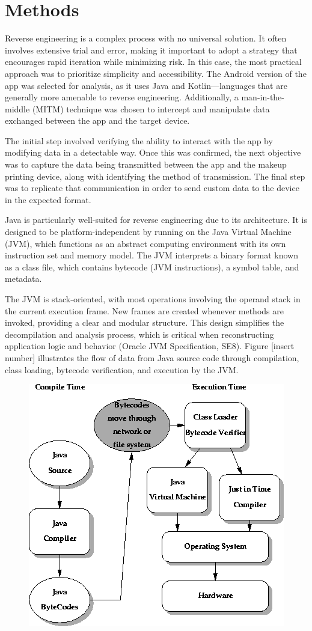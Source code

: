 \chapter{Methods}
Reverse engineering is a complex process with no universal solution. It often involves extensive trial and error, making it important to adopt a strategy that encourages rapid iteration while minimizing risk. In this case, the most practical approach was to prioritize simplicity and accessibility. The Android version of the app was selected for analysis, as it uses Java and Kotlin—languages that are generally more amenable to reverse engineering. Additionally, a man-in-the-middle (MITM) technique was chosen to intercept and manipulate data exchanged between the app and the target device.

The initial step involved verifying the ability to interact with the app by modifying data in a detectable way. Once this was confirmed, the next objective was to capture the data being transmitted between the app and the makeup printing device, along with identifying the method of transmission. The final step was to replicate that communication in order to send custom data to the device in the expected format.

Java is particularly well-suited for reverse engineering due to its architecture. It is designed to be platform-independent by running on the Java Virtual Machine (JVM), which functions as an abstract computing environment with its own instruction set and memory model. The JVM interprets a binary format known as a class file, which contains bytecode (JVM instructions), a symbol table, and metadata.

The JVM is stack-oriented, with most operations involving the operand stack in the current execution frame. New frames are created whenever methods are invoked, providing a clear and modular structure. This design simplifies the decompilation and analysis process, which is critical when reconstructing application logic and behavior (Oracle JVM Specification, SE8).
Figure [insert number] illustrates the flow of data from Java source code through compilation, class loading, bytecode verification, and execution by the JVM.
\begin{figure}
	\centering
	\includegraphics[width=0.7\linewidth]{java_process}
	\caption{}
	\label{fig:javaprocess}
\end{figure}

